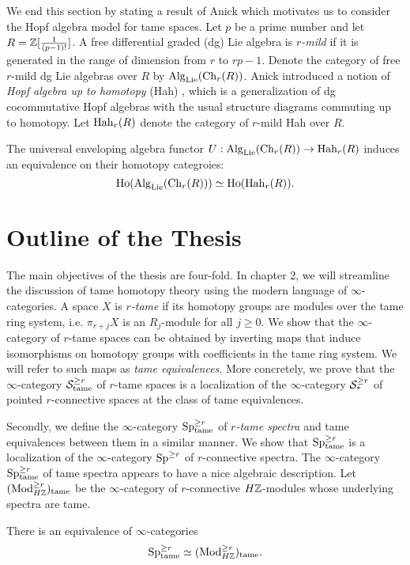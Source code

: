 We end this section by stating a result of Anick \cite{AnickHopf} which motivates us to consider the Hopf algebra model for tame spaces.
Let $p$ be a prime number and let $R={\mathbb{Z}}[{\frac{1}{(p-1)!}}]$. 
A free differential graded (dg) Lie algebra is \emph{$r$-mild}  if it is generated in the range of dimension from $r$ to $rp-1$. Denote the category of free $r$-mild dg Lie algebras over $R$  by $\operatorname{Alg}_{\operatorname{Lie}}(\operatorname{Ch}_{r}(R))$. Anick introduced a notion of \emph{Hopf algebra up to homotopy} (Hah) \cite[Definition 4.1]{AnickHopf}, which is a generalization of dg cocommutative Hopf algebras with the usual structure diagrams commuting up to homotopy. Let $\operatorname{Hah}_{r}(R)$ denote the category of $r$-mild Hah over $R$.

\begin{theorem}
The universal enveloping algebra functor $U:\operatorname{Alg}_{\operatorname{Lie}}(\operatorname{Ch}_{r}(R))\rightarrow \operatorname{Hah}_{r}(R)$ induces an equivalence on their homotopy categroies:
$$
\operatorname{Ho}(\operatorname{Alg}_{\operatorname{Lie}}(\operatorname{Ch}_{r}(R)) )\simeq \operatorname{Ho}(\operatorname{Hah}_{r}(R)).
$$
\end{theorem}


\section{Outline of the Thesis}
The main objectives of the thesis are four-fold.
In chapter 2, we will streamline the discussion of tame homotopy theory using the modern language of $\infty$-categories.
A space $X$ is \emph{$r$-tame} if its homotopy groups are modules over the tame ring system, i.e.
$\pi_{r+j}X$ is an $R_j$-module for all $j\geq 0$.
We show that the $\infty$-category of $r$-tame spaces can be obtained by inverting maps that induce isomorphisms on homotopy groups with coefficients in the tame ring system. We will refer to such maps as \emph{tame equivalences}.
More concretely, we prove that the $\infty$-category ${\mathcal{S}}^{\geq r}_{\operatorname{\operatorname{tame}}}$ of $r$-tame spaces is a localization of the $\infty$-category ${\mathcal{S}}^{\geq r}_*$ of pointed $r$-connective spaces at the class of tame equivalences.

Secondly, we define the $\infty$-category $\operatorname{Sp}^{\geq r}_{\operatorname{\operatorname{tame}}}$ of \emph{$r$-tame spectra} and tame equivalences between them in a similar manner. We show that $\operatorname{Sp}^{\geq r}_{\operatorname{\operatorname{tame}}}$ is a localization of the $\infty$-category $\operatorname{Sp}^{\geq r}$ of $r$-connective spectra.
The $\infty$-category $\operatorname{Sp}^{\geq r}_{\operatorname{\operatorname{tame}}}$ of tame spectra appears to have a nice algebraic description.
Let $(\operatorname{Mod}_{H{\mathbb{Z}}}^{\geq r})_{\operatorname{\operatorname{tame}}}$ be the $\infty$-category of $r$-connective $H{\mathbb{Z}}$-modules whose underlying spectra are tame.
\begin{thmx}
\label{Theorem B}
There is an equivalence of $\infty$-categories
$$
\operatorname{Sp}^{\geq r}_{\operatorname{\operatorname{tame}}} \simeq (\operatorname{Mod}_{H{\mathbb{Z}}}^{\geq r})_{\operatorname{\operatorname{tame}}}.
$$
\end{thmx}

